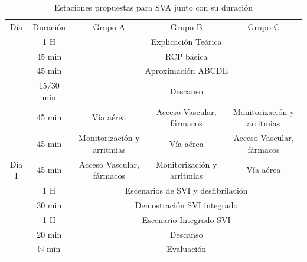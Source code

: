 \begin{table}[hptb]
    \centering
    \begin{tabular}{ccccc}
    \rowcolor[HTML]{333333} 
    {\color[HTML]{FFFFFF} Día} & {\color[HTML]{FFFFFF} Duración} & {\color[HTML]{FFFFFF} Grupo A} & {\color[HTML]{FFFFFF} Grupo B} & {\color[HTML]{FFFFFF} Grupo C} \\
     & 1 H & \multicolumn{3}{c}{Explicación Teórica} \\
     & \cellcolor[HTML]{D9D9D9}45 min & \multicolumn{3}{c}{\cellcolor[HTML]{D9D9D9}RCP básica} \\
     & 45 min & \multicolumn{3}{c}{Aproximación ABCDE} \\
     & \cellcolor[HTML]{D9D9D9}15/30 min & \multicolumn{3}{c}{\cellcolor[HTML]{D9D9D9}Descanso} \\
     & 45 min & Vía aérea & Acceso Vascular, fármacos & Monitorización y arritmias \\
     & \cellcolor[HTML]{D9D9D9}45 min & \cellcolor[HTML]{D9D9D9}Monitorización y arritmias & \cellcolor[HTML]{D9D9D9}Vía aérea & \cellcolor[HTML]{D9D9D9}Acceso Vascular,  fármacos \\
    \multirow{-7}{*}{Día I} & 45 min & Acceso Vascular, fármacos & Monitorización y arritmias & Vía aérea \\ \hline
    \rowcolor[HTML]{D9D9D9} 
    \cellcolor[HTML]{D9D9D9} & 1 H & \multicolumn{3}{c}{\cellcolor[HTML]{D9D9D9}Escenarios de SVI y desfibrilación} \\
    \cellcolor[HTML]{D9D9D9} & 30 min & \multicolumn{3}{c}{Demostración SVI integrado} \\
    \rowcolor[HTML]{D9D9D9} 
    \cellcolor[HTML]{D9D9D9} & 1 H & \multicolumn{3}{c}{\cellcolor[HTML]{D9D9D9}Escenario Integrado SVI} \\
    \cellcolor[HTML]{D9D9D9} & 20 min & \multicolumn{3}{c}{Descanso} \\
    \rowcolor[HTML]{D9D9D9} 
    \multirow{-5}{*}{\cellcolor[HTML]{D9D9D9}Día II} & $\mathbb{N}$ min & \multicolumn{3}{c}{\cellcolor[HTML]{D9D9D9}Evaluación} \\ \hline
    \end{tabular}
    \caption{Estaciones propuestas para SVA junto con su duración}
    \label{tab:Brusilov:SVI:Estaciones}
\end{table}

